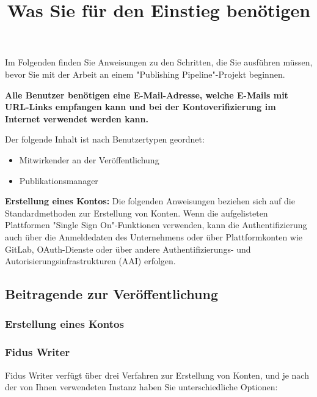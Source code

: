 \documentclass{article}
\begin{document}
\title{Was Sie für den Einstieg benötigen}

\maketitle


Im Folgenden finden Sie Anweisungen zu den Schritten, die Sie ausführen müssen, bevor Sie mit der Arbeit an einem "Publishing Pipeline"-Projekt beginnen.


\textbf{Alle Benutzer benötigen eine E-Mail-Adresse, welche E-Mails mit URL-Links empfangen kann und bei der Kontoverifizierung im Internet verwendet werden kann.}


Der folgende Inhalt ist nach Benutzertypen geordnet:

\begin{itemize}
\item Mitwirkender an der Veröffentlichung


\item Publikationsmanager


\end{itemize}

\textbf{Erstellung eines Kontos:} Die folgenden Anweisungen beziehen sich auf die Standardmethoden zur Erstellung von Konten. Wenn die aufgelisteten Plattformen "Single Sign On"-Funktionen verwenden, kann die Authentifizierung auch über die Anmeldedaten des Unternehmens oder über Plattformkonten wie GitLab, OAuth-Dienste oder über andere Authentifizierungs- und Autorisierungsinfrastrukturen (AAI) erfolgen.


\subsection{Beitragende zur Veröffentlichung}\label{H9091768}



\subsubsection{Erstellung eines Kontos}\label{H7088114}



\subsubsection{Fidus Writer}\label{H6131222}



Fidus Writer verfügt über drei Verfahren zur Erstellung von Konten, und je nach der von Ihnen verwendeten Instanz haben Sie unterschiedliche Optionen:
\end{document}
